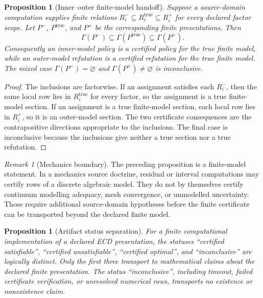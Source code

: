 \documentclass[11pt]{article}
\theoremstyle{plain}
\newtheorem{proposition}[theorem]{Proposition}
\theoremstyle{definition}
\theoremstyle{remark}
\newtheorem{remark}[theorem]{Remark}
\begin{document}
\begin{proposition}[Inner--outer finite-model handoff]
\label{prop:inner-outer-finite-handoff}
Suppose a source-domain computation supplies finite relations
$R_i^-\subseteq R_i^{\mathrm{true}}\subseteq R_i^+$ for every declared factor
scope. Let $P^-$, $P^{\mathrm{true}}$, and $P^+$ be the corresponding finite
presentations. Then
\[
\Gamma(P^-)
\subseteq
\Gamma(P^{\mathrm{true}})
\subseteq
\Gamma(P^+).
\]
Consequently an inner-model policy is a certified policy for the true finite
model, while an outer-model refutation is a certified refutation for the true
finite model. The mixed case $\Gamma(P^-)=\varnothing$ and
$\Gamma(P^+)\ne\varnothing$ is inconclusive.
\end{proposition}

\begin{proof}
The inclusions are factorwise. If an assignment satisfies each $R_i^-$, then the
same local row lies in $R_i^{\mathrm{true}}$ for every factor, so the assignment
is a true finite-model section. If an assignment is a true finite-model section,
each local row lies in $R_i^+$, so it is an outer-model section. The two
certificate consequences are the contrapositive directions appropriate to the
inclusions. The final case is inconclusive because the inclusions give neither a
true section nor a true refutation.
\end{proof}

\begin{remark}[Mechanics boundary]
The preceding proposition is a finite-model statement. In a mechanics source
doctrine, residual or interval computations may certify rows of a discrete
algebraic model. They do not by themselves certify continuum modelling adequacy,
mesh convergence, or unmodelled uncertainty. Those require additional
source-domain hypotheses before the finite certificate can be transported beyond
the declared finite model.
\end{remark}

\begin{proposition}[Artifact status separation]
\label{prop:artifact-status-separation}
For a finite computational implementation of a declared ECD presentation, the
statuses ``certified satisfiable'', ``certified unsatisfiable'', ``certified
optimal'', and ``inconclusive'' are logically distinct. Only the first three
transport to mathematical claims about the declared finite presentation. The
status ``inconclusive'', including timeout, failed certificate verification, or
unresolved numerical rows, transports no existence or nonexistence claim.
\end{proposition}
\end{document}
